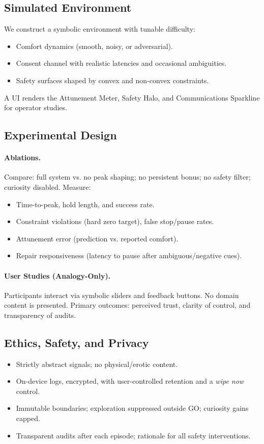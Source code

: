 \documentclass[12pt]{article}
\begin{document}
\subsection{Simulated Environment}
We construct a symbolic environment with tunable difficulty:
\begin{itemize}[leftmargin=*]
  \item Comfort dynamics (smooth, noisy, or adversarial).
  \item Consent channel with realistic latencies and occasional ambiguities.
  \item Safety surfaces shaped by convex and non-convex constraints.
\end{itemize}
A UI renders the Attunement Meter, Safety Halo, and Communications Sparkline for operator studies.

\subsection{Experimental Design}
\paragraph{Ablations.} Compare: full system vs. no peak shaping; no persistent bonus; no safety filter; curiosity disabled. Measure:
\begin{itemize}[leftmargin=*]
  \item Time-to-peak, hold length, and success rate.
  \item Constraint violations (hard zero target), false stop/pause rates.
  \item Attunement error (prediction vs. reported comfort).
  \item Repair responsiveness (latency to pause after ambiguous/negative cues).
\end{itemize}

\paragraph{User Studies (Analogy-Only).} Participants interact via symbolic sliders and feedback buttons. No domain content is presented. Primary outcomes: perceived trust, clarity of control, and transparency of audits.

\subsection{Ethics, Safety, and Privacy}
\begin{itemize}[leftmargin=*]
  \item Strictly abstract signals; no physical/erotic content.
  \item On-device logs, encrypted, with user-controlled retention and a \emph{wipe now} control.
  \item Immutable boundaries; exploration suppressed outside GO; curiosity gains capped.
  \item Transparent audits after each episode; rationale for all safety interventions.
\end{itemize}
\end{document}
